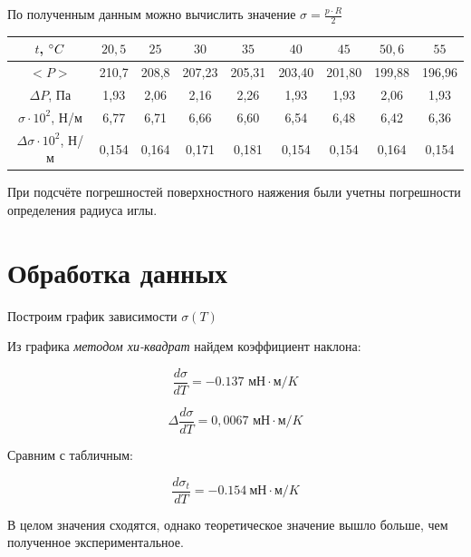 \documentclass[a4paper, 12pt]{article} %
\begin{document}
По полученным данным можно вычислить значение $\sigma = \frac{p \cdot R}{2}$

\begin{center}
\begin{tabular}{|c|c|c|c|c|c|c|c|c|}
\hline
	$t$, $\degree C$ & $20,5$ & $25$ & $30$ & $35$ & $40$ & $45$ & $50,6$ & $55$ 	\\
	\hline
	$<P>$ & 210,7 & 208,8 & 207,23 & 205,31 & 203,40 & 201,80 & 199,88 & 196,96 \\
	\hline
	$\Delta P$, Па & 1,93 & 2,06 & 2,16 & 2,26 & 1,93 & 1,93 & 2,06 & 1,93 \\
	\hline
	$\sigma \cdot 10^2$, Н/м & 6,77 & 6,71 & 6,66 & 6,60 & 6,54 & 6,48 & 6,42 & 6,36 \\
	\hline
	$\Delta \sigma \cdot 10^2$, Н/м & 0,154 & 0,164 & 0,171 & 0,181 & 0,154 & 0,154 & 0,164 & 0,154 \\
	\hline
\end{tabular}
\end{center}

При подсчёте погрешностей поверхностного наяжения были учетны погрешности определения радиуса иглы.


\bigskip

\section{Обработка данных}

\smallskip

Построим график зависимости $\sigma(T)$

\smallskip

Из графика \textit{методом хи-квадрат} найдем коэффициент наклона:

\smallskip

\begin{equation}
	\frac{d \sigma}{dT} = -0.137 \text{ мН} \cdot \text{м} / K
\end{equation}


\begin{equation}
	\Delta \frac{d \sigma}{dT} = 0,0067 \text{ мН} \cdot \text{м} / K
\end{equation}

Сравним с табличным:

\begin{equation}
	\frac{d\sigma_t}{dT} = -0.154\ \text{мН} \cdot \text{м} / K
\end{equation}

В целом значения сходятся, однако теоретическое значение вышло больше, чем полученное экспериментальное.
\end{document}
